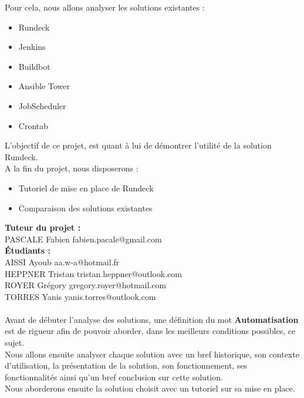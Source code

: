 \documentclass[12pt]{article}
\begin{document}
Pour cela, nous allons analyser les solutions existantes :
\begin{itemize}
    \item Rundeck
    \item Jenkins
    \item Buildbot
    \item Ansible Tower
    \item JobScheduler
    \item Crontab
\end{itemize}
\vspace{0.5cm}
L'objectif de ce projet, est quant à lui de démontrer l'utilité de la solution Rundeck.
\vspace{0.5cm}
\\
A la fin du projet, nous disposerons :
\begin{itemize}
    \item Tutoriel de mise en place de Rundeck
    \item Comparaison des solutions existantes
\end{itemize}
\vspace{0.5cm}
\textbf{Tuteur du projet : }
\\
PASCALE Fabien \hspace{3.3cm} fabien.pacale@gmail.com
\vspace{0.5cm}
\\
\textbf{Étudiants : }
\\
AISSI Ayoub \hspace{4.2cm} aa.w-a@hotmail.fr
\\ 
HEPPNER Tristan \hspace{3.2cm} tristan.heppner@outlook.com
\\ 
ROYER Grégory \hspace{3.5cm} gregory.royer@hotmail.com
\\ 
TORRES Yanis \hspace{3.7cm} yanis.torres@outlook.com
\\
\vspace{0.5cm}
\\
Avant de débuter l'analyse des solutions, une définition du mot \textbf{Automatisation} est de rigueur afin de pouvoir aborder, dans les meilleurs conditions possibles, ce sujet.
\\
Nous allons ensuite analyser chaque solution avec un bref historique, son contexte d'utilisation, la présentation de la solution, son fonctionnement, ses fonctionnalités ainsi qu'un bref conclusion sur cette solution.
\\
Nous aborderons ensuite la solution choisit avec un tutoriel sur sa mise en place.
\end{document}
